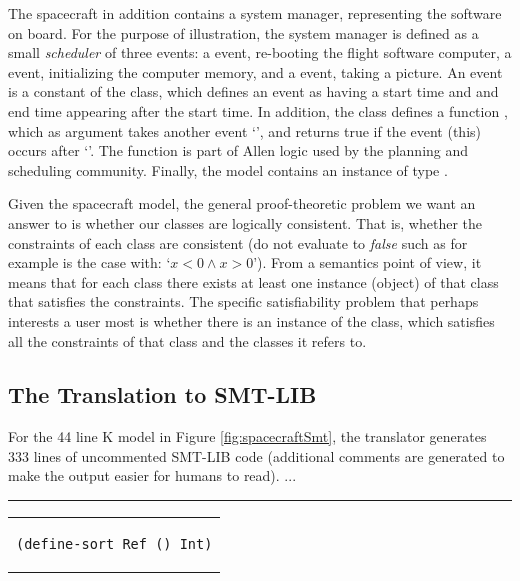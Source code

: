 The spacecraft in addition contains a system manager, representing
the software on board. For the purpose of illustration, the system manager is defined as a small {\em scheduler} of three events: 
a  event, re-booting the flight software computer, a  event, initializing the computer memory, and a 
 event, taking a picture. An event is a constant
of the  class, which defines an event as having a start time and and end time appearing after the start time. In addition, the  class defines a function ,
which as argument takes another event `', 
and returns true if the event (this) occurs after `'.
The  function is part of Allen logic 
\cite{allen-logic-84} used by the planning and scheduling community. 
%
Finally, the model contains an instance  of type
.

Given the spacecraft model, the general proof-theoretic
problem we want an answer to is whether our classes are logically consistent. That is, whether the constraints of each class are consistent (do not evaluate to {\em false} such as for example is
the case with: `$x < 0 \wedge x > 0$'). From a semantics point of view, it means that for each class there exists at least one instance (object) of that class that satisfies the constraints. 
The specific satisfiability problem that perhaps interests a
user most is whether there is an instance of the  class, which satisfies all the constraints of that class and the classes it refers to.

\subsection{The Translation to SMT-LIB}

\lstset{language=SMT}

For the 44 line K model in Figure \ref{fig:spacecraftSmt},
the translator generates 333 lines of uncommented SMT-LIB code (additional comments are generated to make the output easier for humans to read). ...

\rule{\textwidth}{1pt}

\begin{center}
\begin{tabular}{c}
\begin{lstlisting}
(define-sort Ref () Int)
\end{lstlisting}
\end{tabular}
\end{center}

